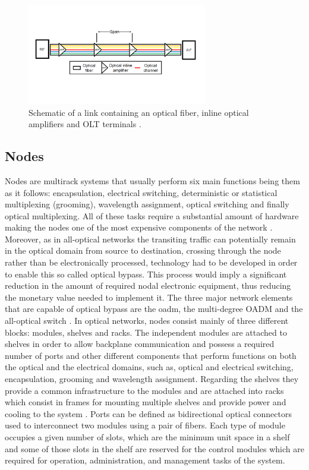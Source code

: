 \begin{figure}[H]
  \label{cisco}
  \begin{center}
    \includegraphics[width=0.7\textwidth]{fig/logos/link.pdf}
    \caption{Schematic of a link containing an optical fiber, inline optical amplifiers and OLT terminals \cite{RuiMoraisPhD}.}
  \end{center}
\end{figure}

\subsection{Nodes}

Nodes are multirack systems that usually perform six main functions being them as it follows: encapsulation, electrical switching, deterministic or statistical multiplexing (grooming), wavelength assignment, optical switching and finally optical multiplexing. All of these tasks require a substantial amount of hardware making the nodes one of the most expensive components of the network \cite{anpinto}. Moreover, as in all-optical networks the transiting traffic can potentially remain in the optical domain from source to destination, crossing through the node rather than be electronically processed, technology had to be developed in order to enable this so called optical bypass. This process would imply a significant reduction in the amount of required nodal electronic equipment, thus reducing the monetary value needed to implement it. The three major network elements that are capable of optical bypass are the \gls{oadm}, the multi-degree OADM and the all-optical switch \cite{SimmonsJane2008}. In optical networks, nodes consist mainly of three different blocks: modules, shelves and racks. The independent modules are attached to shelves in order to allow backplane communication and possess a required number of ports and other different components that perform functions on both the optical and the electrical domains, such as, optical and electrical switching, encapsulation, grooming and wavelength assignment. Regarding the shelves they provide a common infrastructure to the modules and are attached into racks which consist in frames for mounting multiple shelves and provide power and cooling to the system \cite{RuiMoraisPhD}. Ports can be defined as bidirectional optical connectors used to interconnect two modules using a pair of fibers. Each type of module occupies a given number of slots, which are the minimum unit space in a shelf and some of those slots in the shelf are reserved for the control modules which are required for operation, administration, and management tasks of the system.
 
